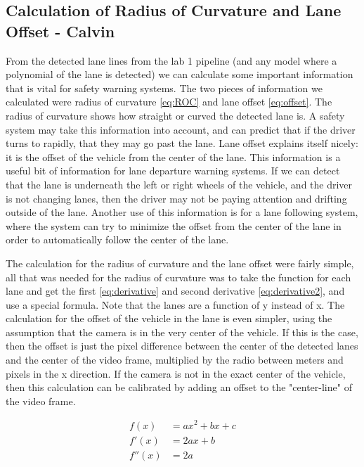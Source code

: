 \documentclass[twoside,twocolumn]{article}
\begin{document}
\subsection{Calculation of Radius of Curvature and Lane Offset - Calvin}
\par From the detected lane lines from the lab 1 pipeline (and any model where a polynomial of the lane is detected) we can calculate some important information that is vital for safety warning systems. The two pieces of information we calculated were radius of curvature \ref{eq:ROC} and lane offset \ref{eq:offset}. The radius of curvature shows how straight or curved the detected lane is. A safety system may take this information into account, and can predict that if the driver turns to rapidly, that they may go past the lane. Lane offset explains itself nicely: it is the offset of the vehicle from the center of the lane. This information is a useful bit of information for lane departure warning systems. If we can detect that the lane is underneath the left or right wheels of the vehicle, and the driver is not changing lanes, then the driver may not be paying attention and drifting outside of the lane. Another use of this information is for a lane following system, where the system can try to minimize the offset from the center of the lane in order to automatically follow the center of the lane.
\par The calculation for the radius of curvature and the lane offset were fairly simple, all that was needed for the radius of curvature was to take the function for each lane and get the first \ref{eq:derivative} and second derivative \ref{eq:derivative2}, and use a special formula. Note that the lanes are a function of y instead of x. The calculation for the offset of the vehicle in the lane is even simpler, using the assumption that the camera is in the very center of the vehicle. If this is the case, then the offset is just the pixel difference between the center of the detected lanes and the center of the video frame, multiplied by the radio between meters and pixels in the x direction. If the camera is not in the exact center of the vehicle, then this calculation can be calibrated by adding an offset to the "center-line" of the video frame.

\begin{subequations}
\begin{align}
f(x) &= ax^2 + bx + c \\
f'(x) &= 2ax + b \label{eq:derivative} \\
f''(x) &= 2a \label{eq:derivative2}
\end{align}
\end{subequations}
\end{document}

